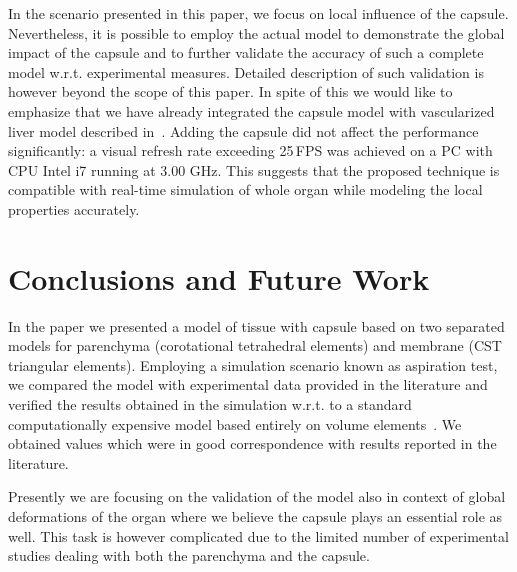 \documentclass{acm_proc_article-sp}
\newcommand{\TG}[1]{{\color{blue}\textbf{TG: #1}}}
\begin{document}

In the scenario presented in this paper, we focus on local influence of the capsule.
Nevertheless, it is possible to employ the actual model to demonstrate the global 
impact of the capsule and to further validate the accuracy of such a complete model w.r.t. experimental measures. 
Detailed description of such validation is however beyond the scope of this paper. 
In spite of this we would like to emphasize that we have already integrated the
capsule model with vascularized liver model described in~\cite{Peterlik2012}. 
Adding the capsule did not affect the
performance significantly: a visual refresh rate exceeding 25\,FPS was achieved on a
PC with CPU Intel i7 running at 3.00 GHz.
This suggests that the proposed technique is compatible with real-time simulation of whole
organ while modeling the local properties accurately.



\section{Conclusions and Future Work} %
In the paper we presented a model of tissue with capsule based on two separated models for parenchyma (corotational tetrahedral elements)
and membrane (CST triangular elements). Employing a simulation scenario known as aspiration test, 
we compared the model with experimental data provided in the literature 
and verified the results obtained in the simulation w.r.t. to a standard computationally expensive model based entirely on volume elements~\cite{Hollenstein2006}. We obtained values which were in good correspondence with results reported in the literature. 

Presently we are focusing on the validation of the model also in context of
global deformations of the organ where we believe the capsule plays an
essential role as well. This task is however complicated due to the limited number of experimental studies dealing with 
both the parenchyma and the capsule. 
\end{document}
